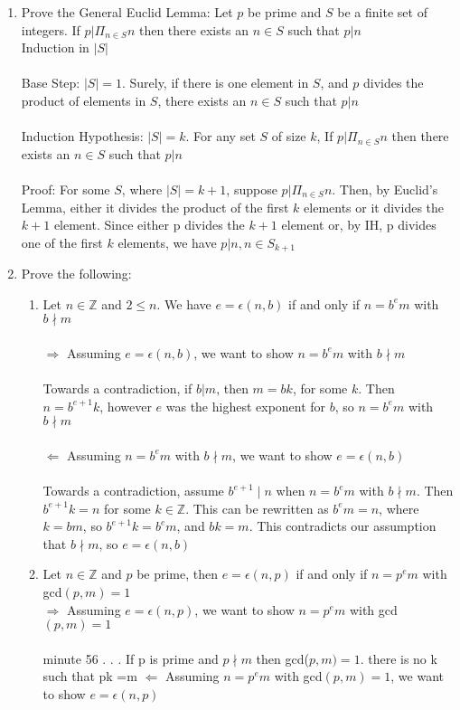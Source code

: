 \documentclass[11pt]{article}
\begin{document}
\begin{enumerate}
\newpage %
\item Prove the General Euclid Lemma: Let $p$ be prime and $S$ be a finite set of integers.  If $p|\Pi_{n \in S}n$ then there exists an $n \in S$ such that $p | n$
\\
Induction in $|S|$
\\\\
Base Step: $|S| = 1$.  Surely, if there is one element in $S$, and $p$ divides the product of elements in $S$, there exists an $n \in S$ such that $p | n$
\\
\\
Induction Hypothesis: $|S| = k$.  For any set $S$ of size $k$, If $p|\Pi_{n \in S}n$ then there exists an $n \in S$ such that $p | n$
\\
\\
Proof: For some $S$, where $|S| = k + 1$, suppose $p | \Pi_{n \in S}n$.  Then, by Euclid's Lemma, either it divides the product of the first $k$ elements or it divides the $k+1$ element.  Since either p divides the $k+1$ element or, by IH, p divides one of the first $k$ elements, we have $p |n, n \in S_{k+1}$

\newpage %
\item Prove the following:
\begin{enumerate}
\item Let $n \in \mathbb{Z}$ and $2 \leq n$.  We have $e = \epsilon(n,b)$ if and only if $n = b^em$ with $b \nmid m$\\
\\
$\Rightarrow$ Assuming $e = \epsilon(n,b)$, we want to show $n = b^em$ with $b \nmid m$\\
\\
Towards a contradiction, if $b|m$, then $m = bk$, for some $k$.  Then $n = b^{e+1}k$, however $e$ was the highest exponent for $b$, so $n = b^em$ with $b \nmid m$
\\
\\
$\Leftarrow$ Assuming $n = b^em$ with $b \nmid m$, we want to show $e = \epsilon(n,b)$\\
\\
Towards a contradiction, assume $b^{e+1} \mid n$ when $n = b^em$ with $b \nmid m$.  Then $b^{e+1}k = n$ for some $k \in \mathbb{Z}$.  This can be rewritten as $b^em = n$, where $k = bm$, so $b^{e+1}k = b^em$, and $bk=m$.  This contradicts our assumption that $b \nmid m$, so $e = \epsilon(n,b)$
\\

\item Let $n \in \mathbb{Z}$ and $p$ be prime, then $e = \epsilon(n,p)$ if and only if $n = p^em$ with gcd$(p,m) = 1$\\
$\Rightarrow$ Assuming $e = \epsilon(n,p)$, we want to show $n = p^em$ with gcd$(p,m) = 1$\\
\\
minute 56 . . . If p is prime and $p \nmid m$ then gcd($p,m) = 1$.  there is no k such that pk =m
$\Leftarrow$ Assuming $n = p^em$ with gcd$(p,m) = 1$, we want to show $e = \epsilon(n,p)$\\
\\
\\
\end{enumerate}



\end{enumerate}
\end{document}
